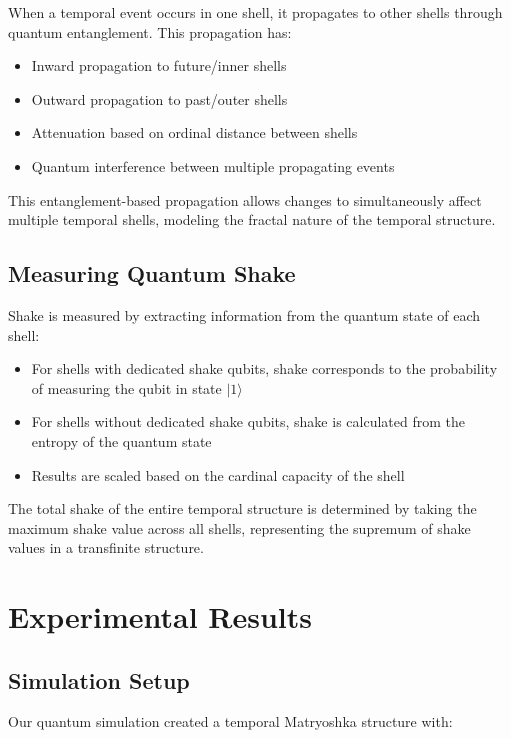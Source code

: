 \documentclass[12pt,a4paper]{article}
\begin{document}
When a temporal event occurs in one shell, it propagates to other shells through quantum entanglement. This propagation has:

\begin{itemize}
    \item Inward propagation to future/inner shells
    \item Outward propagation to past/outer shells
    \item Attenuation based on ordinal distance between shells
    \item Quantum interference between multiple propagating events
\end{itemize}

This entanglement-based propagation allows changes to simultaneously affect multiple temporal shells, modeling the fractal nature of the temporal structure.

\subsection{Measuring Quantum Shake}

Shake is measured by extracting information from the quantum state of each shell:

\begin{itemize}
    \item For shells with dedicated shake qubits, shake corresponds to the probability of measuring the qubit in state $|1\rangle$
    \item For shells without dedicated shake qubits, shake is calculated from the entropy of the quantum state
    \item Results are scaled based on the cardinal capacity of the shell
\end{itemize}

The total shake of the entire temporal structure is determined by taking the maximum shake value across all shells, representing the supremum of shake values in a transfinite structure.

\section{Experimental Results}

\subsection{Simulation Setup}

Our quantum simulation created a temporal Matryoshka structure with:
\end{document}
